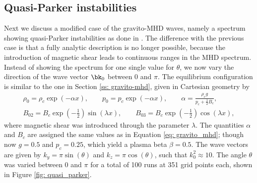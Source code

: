 \subsection{Quasi-Parker instabilities} \label{ss: quasi-parker}
Next we discuss a modified case of the gravito-MHD waves, namely a spectrum showing quasi-Parker instabilities as done in \citet[Figure 12.2]{book_MHD}. The difference with the previous case is that a fully analytic description is no longer possible, because the introduction of magnetic shear leads to continuous ranges in the MHD spectrum. Instead of showing the spectrum for one single value for $\theta$, we now vary the direction of the wave vector $\bk_0$ between 0 and $\pi$. The equilibrium configuration is similar to the one in Section \ref{ss: gravito-mhd}, given in Cartesian geometry by
\begin{equation} \label{eq: quasi-parker}
  \begin{gathered}
    \rho_0 = \rho_c \exp\left(-\alpha x\right),
    \qquad
    p_0 = p_c \exp\left(-\alpha x\right),
    \qquad
    \alpha = \frac{\rho_c g}{p_c + \frac{1}{2}B_c}, \\
    B_{02} = B_c \exp\left(-\frac{1}{2}\right)\sin\left(\lambda x\right),
    \qquad
    B_{03} = B_c \exp\left(-\frac{1}{2}\right)\cos\left(\lambda x\right),
  \end{gathered}
\end{equation}
where magnetic shear was introduced through the parameter $\lambda$. The quantities $\alpha$ and $B_c$ are assigned the same values as in Equation \eqref{eq: gravito_mhd}; though now $g = 0.5$ and $p_c = 0.25$, which yield a plasma beta $\beta = 0.5$. The wave vectors are given by $k_y = \pi\sin(\theta)$ and $k_z = \pi\cos(\theta)$, such that $k_0^2 \approx 10$. The angle $\theta$ was varied between 0 and $\pi$ for a total of 100 runs at 351 grid points each, shown in Figure \ref{fig: quasi_parker}.

